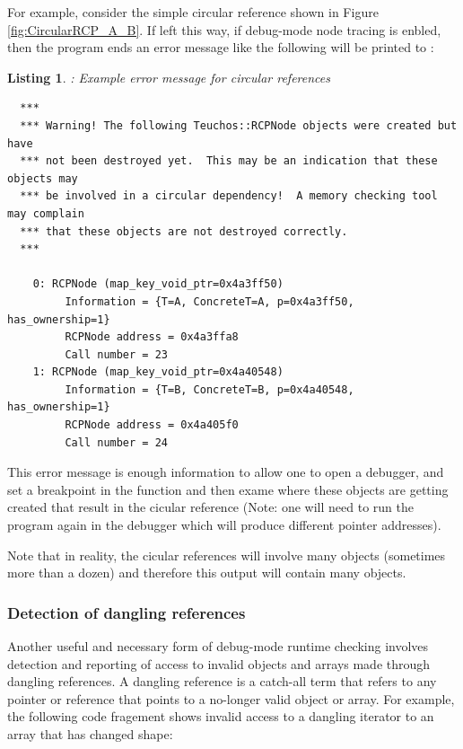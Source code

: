 \documentclass[pdf,ps2pdf,11pt]{SANDreport}
\newtheorem{listing}{Listing}
\begin{document}
For example, consider the simple circular reference shown in Figure
{}\ref{fig:CircularRCP_A_B}.  If left this way, if debug-mode node
tracing is enbled, then the program ends an error message like the
following will be printed to {}:

\begin{listing}: Example error message for circular references \\
\label{listing:curcular-ref-error-msg}
{\small\begin{verbatim}
  ***
  *** Warning! The following Teuchos::RCPNode objects were created but have
  *** not been destroyed yet.  This may be an indication that these objects may
  *** be involved in a circular dependency!  A memory checking tool may complain
  *** that these objects are not destroyed correctly.
  ***
  
    0: RCPNode (map_key_void_ptr=0x4a3ff50)
         Information = {T=A, ConcreteT=A, p=0x4a3ff50, has_ownership=1}
         RCPNode address = 0x4a3ffa8
         Call number = 23
    1: RCPNode (map_key_void_ptr=0x4a40548)
         Information = {T=B, ConcreteT=B, p=0x4a40548, has_ownership=1}
         RCPNode address = 0x4a405f0
         Call number = 24
\end{verbatim}}
\end{listing}

This error message is enough information to allow one to open a
debugger, and set a breakpoint in the function
{} and then exame where these
objects are getting created that result in the cicular reference
(Note: one will need to run the program again in the debugger which
will produce different pointer addresses).

Note that in reality, the cicular references will involve many objects
(sometimes more than a dozen) and therefore this output will contain
many {} objects.


%
{}\subsubsection{Detection of dangling references}
\label{sec:detection-dangling-references}
%

Another useful and necessary form of debug-mode runtime checking
involves detection and reporting of access to invalid objects and
arrays made through dangling references.  A dangling reference is a
catch-all term that refers to any pointer or reference that points to
a no-longer valid object or array.  For example, the following code
fragement shows invalid access to a dangling iterator to an array that
has changed shape:
\end{document}
